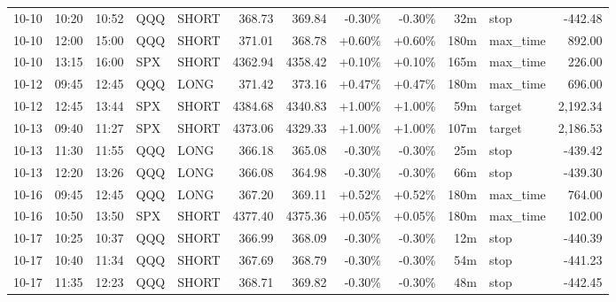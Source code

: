 \documentclass[11pt,a4paper,twoside]{article}
\begin{document}
\begin{center}
\begin{longtable}{>{\color{txtmain}}l l l l l r r r r r >{\color{txtmain}}l r}
10-10 & 10:20 & 10:52 & QQQ & SHORT & 368.73 & 369.84 & \textcolor{lossred}{-0.30\%} & \textcolor{lossred}{-0.30\%} & 32m & stop & \textcolor{lossred}{-442.48} \\
10-10 & 12:00 & 15:00 & QQQ & SHORT & 371.01 & 368.78 & \textcolor{wingreen}{+0.60\%} & \textcolor{wingreen}{+0.60\%} & 180m & max\_time & \textcolor{wingreen}{892.00} \\
10-10 & 13:15 & 16:00 & SPX & SHORT & 4362.94 & 4358.42 & \textcolor{wingreen}{+0.10\%} & \textcolor{wingreen}{+0.10\%} & 165m & max\_time & \textcolor{wingreen}{226.00} \\
10-12 & 09:45 & 12:45 & QQQ & LONG & 371.42 & 373.16 & \textcolor{wingreen}{+0.47\%} & \textcolor{wingreen}{+0.47\%} & 180m & max\_time & \textcolor{wingreen}{696.00} \\
10-12 & 12:45 & 13:44 & SPX & SHORT & 4384.68 & 4340.83 & \textcolor{wingreen}{+1.00\%} & \textcolor{wingreen}{+1.00\%} & 59m & target & \textcolor{wingreen}{2,192.34} \\
10-13 & 09:40 & 11:27 & SPX & SHORT & 4373.06 & 4329.33 & \textcolor{wingreen}{+1.00\%} & \textcolor{wingreen}{+1.00\%} & 107m & target & \textcolor{wingreen}{2,186.53} \\
10-13 & 11:30 & 11:55 & QQQ & LONG & 366.18 & 365.08 & \textcolor{lossred}{-0.30\%} & \textcolor{lossred}{-0.30\%} & 25m & stop & \textcolor{lossred}{-439.42} \\
10-13 & 12:20 & 13:26 & QQQ & LONG & 366.08 & 364.98 & \textcolor{lossred}{-0.30\%} & \textcolor{lossred}{-0.30\%} & 66m & stop & \textcolor{lossred}{-439.30} \\
10-16 & 09:45 & 12:45 & QQQ & LONG & 367.20 & 369.11 & \textcolor{wingreen}{+0.52\%} & \textcolor{wingreen}{+0.52\%} & 180m & max\_time & \textcolor{wingreen}{764.00} \\
10-16 & 10:50 & 13:50 & SPX & SHORT & 4377.40 & 4375.36 & \textcolor{wingreen}{+0.05\%} & \textcolor{wingreen}{+0.05\%} & 180m & max\_time & \textcolor{wingreen}{102.00} \\
10-17 & 10:25 & 10:37 & QQQ & SHORT & 366.99 & 368.09 & \textcolor{lossred}{-0.30\%} & \textcolor{lossred}{-0.30\%} & 12m & stop & \textcolor{lossred}{-440.39} \\
10-17 & 10:40 & 11:34 & QQQ & SHORT & 367.69 & 368.79 & \textcolor{lossred}{-0.30\%} & \textcolor{lossred}{-0.30\%} & 54m & stop & \textcolor{lossred}{-441.23} \\
10-17 & 11:35 & 12:23 & QQQ & SHORT & 368.71 & 369.82 & \textcolor{lossred}{-0.30\%} & \textcolor{lossred}{-0.30\%} & 48m & stop & \textcolor{lossred}{-442.45} \\

\end{longtable}
\end{center}
\end{document}
